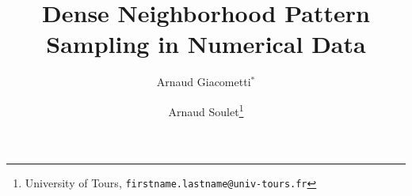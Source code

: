 \documentclass[twoside,leqno,twocolumn]{article}
\begin{document}

\title{\Large Dense Neighborhood Pattern Sampling in Numerical Data}
\author{Arnaud Giacometti$^*$ \and Arnaud Soulet\thanks{{University of Tours}, \texttt{firstname.lastname@univ-tours.fr}}}
\date{}

\maketitle







\end{document}
